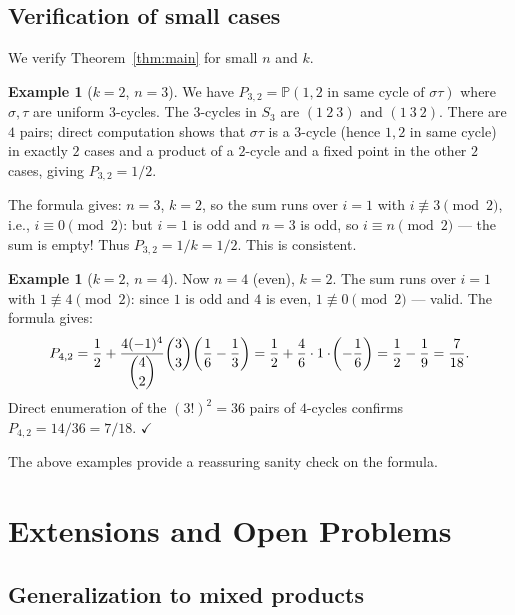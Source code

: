 \documentclass[12pt,a4paper]{article}
\theoremstyle{definition}
\newtheorem{example}[theorem]{Example}
\newcommand{\Prob}{\mathbb{P}}
\renewcommand{\binom}[2]{\dbinom{#1}{#2}}
\begin{document}
\subsection{Verification of small cases}

We verify Theorem~\ref{thm:main} for small $n$ and $k$.

\begin{example}[$k=2$, $n=3$]
\label{ex:k2n3}
We have $P_{3,2} = \Prob(1,2\text{ in same cycle of }\sigma\tau)$
where $\sigma,\tau$ are uniform $3$-cycles.  The $3$-cycles in $S_3$
are $(1\ 2\ 3)$ and $(1\ 3\ 2)$.  There are $4$ pairs; direct computation
shows that $\sigma\tau$ is a $3$-cycle (hence $1,2$ in same cycle) in
exactly $2$ cases and a product of a $2$-cycle and a fixed point in the
other $2$ cases, giving $P_{3,2}=1/2$.

The formula gives: $n=3$, $k=2$, so the sum runs over $i=1$ with
$i\not\equiv 3\pmod{2}$, i.e., $i\equiv 0\pmod{2}$: but $i=1$ is odd
and $n=3$ is odd, so $i\equiv n\pmod{2}$ — the sum is empty!  Thus
$P_{3,2}=1/k=1/2$.  This is consistent.
\end{example}

\begin{example}[$k=2$, $n=4$]
\label{ex:k2n4}
Now $n=4$ (even), $k=2$.  The sum runs over $i=1$ with $1\not\equiv 4
\pmod{2}$: since $1$ is odd and $4$ is even, $1\not\equiv 0\pmod{2}$
— valid.  The formula gives:
\[
P_{4,2}
= \frac{1}{2}
+ \frac{4(-1)^4}{\binom{4}{2}}\binom{3}{3}\!\left(\frac{1}{6}-\frac{1}{3}\right)
= \frac{1}{2} + \frac{4}{6}\cdot 1\cdot\!\left(-\frac{1}{6}\right)
= \frac{1}{2} - \frac{1}{9}
= \frac{7}{18}.
\]
Direct enumeration of the $(3!)^2=36$ pairs of $4$-cycles confirms
$P_{4,2}=14/36=7/18$.  $\checkmark$
\end{example}

The above examples provide a reassuring sanity check on the formula.

\section{Extensions and Open Problems}
\label{sec:extensions}

\subsection{Generalization to mixed products}
\end{document}

